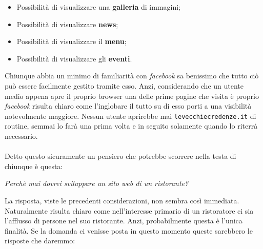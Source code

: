 \begin{itemize}

	\item Possibilità di visualizzare una \textbf{galleria} di immagini;
	\item Possibilità di visualizzare \textbf{news};
	\item Possibilità di visualizzare il \textbf{menu};
	\item Possibilità di visualizzare gli \textbf{eventi}.

\end{itemize}
Chiunque abbia un minimo di familiarità con \textit{facebook} sa benissimo che tutto ciò può essere facilmente gestito tramite esso. Anzi, considerando che un utente medio appena apre il proprio browser una delle prime pagine che visita è proprio \textit{facebook} risulta chiaro come l'inglobare il tutto su di esso porti a una visibilità notevolmente maggiore. Nessun utente aprirebbe mai \texttt{levecchiecredenze.it} di routine, semmai lo farà una prima volta e in seguito solamente quando lo riterrà necessario.\\ \\
Detto questo sicuramente un pensiero che potrebbe scorrere nella testa di chiunque è questa:

\begin{center}

\textit{Perchè mai dovrei sviluppare un sito web di un ristorante?}

\end{center}
La risposta, viste le precedenti considerazioni, non sembra così immediata. Naturalmente risulta chiaro come nell'interesse primario di un ristoratore ci sia l'afflusso di persone nel suo ristorante. Anzi, probabilmente questa è l'unica finalità. Se la domanda ci venisse posta in questo momento queste sarebbero le risposte che daremmo:

